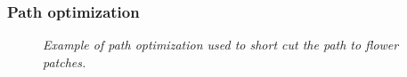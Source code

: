 	\subsubsection{Path optimization}
		\begin{figure}
			\centering
			\caption{\textit{Example of path optimization used to short cut the path to flower patches.}}
			\label{fig:pathOptimization}
		\end{figure}
